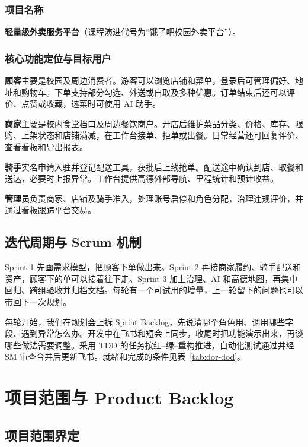 \subsubsection{项目名称}
\textbf{轻量级外卖服务平台}（课程演进代号为“饿了吧校园外卖平台”）。

\subsubsection{核心功能定位与目标用户}

\begin{reportpoints}
  \item \textbf{顾客}主要是校园及周边消费者。游客可以浏览店铺和菜单，登录后可管理偏好、地址和购物车。下单支持部分勾选、外送或自取及多种优惠。订单结束后还可以评价、点赞或收藏，选菜时可使用 AI 助手。
  \item \textbf{商家}主要是校内食堂档口及周边餐饮商户。开店后维护菜品分类、价格、库存、限购、上架状态和店铺满减，在工作台接单、拒单或出餐。日常经营还可回复评价、查看看板和导出报表。
  \item \textbf{骑手}实名申请入驻并登记配送工具，获批后上线抢单。配送途中确认到店、取餐和送达，必要时上报异常。工作台提供高德外部导航、里程统计和预计收益。
  \item \textbf{管理员}负责商家、店铺及骑手准入，处理账号启停和角色分配，治理违规评价，并通过看板跟踪平台交易。
\end{reportpoints}

\subsection{迭代周期与 Scrum 机制}

Sprint 1 先画需求模型，把顾客下单做出来。Sprint 2 再接商家履约、骑手配送和资产，顾客下的单可以接着往下走。Sprint 3 加上治理、AI 和高德地图，再集中回归、跨组验收并归档文档。每轮有一个可试用的增量，上一轮留下的问题也可以\mbox{带回下一次规划}。

每轮开始，我们在规划会上拆 Sprint Backlog，先说清哪个角色用、调用哪些字段、遇到异常怎么办。开发中在飞书和短会上同步，收尾时把功能演示出来，再谈哪些做法需要调整。采用 TDD 的任务按红--绿--重构推进，自动化测试通过并经 SM 审查合并后更新飞书。就绪和完成的条件见表~\ref{tab:dor-dod}。

\section{项目范围与 Product Backlog}

\subsection{项目范围界定}

